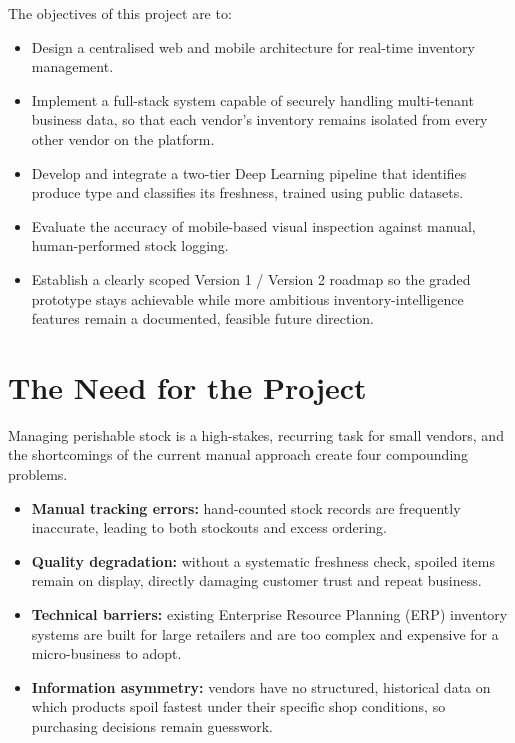 \documentclass[12pt,a4paper]{article}
\begin{document}
The objectives of this project are to:

\begin{itemize}[leftmargin=1.2cm]
    \item Design a centralised web and mobile architecture for real-time inventory management.
    \item Implement a full-stack system capable of securely handling multi-tenant business data, so that each vendor's inventory remains isolated from every other vendor on the platform.
    \item Develop and integrate a two-tier Deep Learning pipeline that identifies produce type and classifies its freshness, trained using public datasets.
    \item Evaluate the accuracy of mobile-based visual inspection against manual, human-performed stock logging.
    \item Establish a clearly scoped Version 1 / Version 2 roadmap so the graded prototype stays achievable while more ambitious inventory-intelligence features remain a documented, feasible future direction.
\end{itemize}

\section{The Need for the Project}

Managing perishable stock is a high-stakes, recurring task for small vendors, and the shortcomings of the current manual approach create four compounding problems.

\begin{itemize}[leftmargin=1.2cm]
    \item \textbf{Manual tracking errors:} hand-counted stock records are frequently inaccurate, leading to both stockouts and excess ordering.
    \item \textbf{Quality degradation:} without a systematic freshness check, spoiled items remain on display, directly damaging customer trust and repeat business.
    \item \textbf{Technical barriers:} existing Enterprise Resource Planning (ERP) inventory systems are built for large retailers and are too complex and expensive for a micro-business to adopt.
    \item \textbf{Information asymmetry:} vendors have no structured, historical data on which products spoil fastest under their specific shop conditions, so purchasing decisions remain guesswork.
\end{itemize}
\end{document}
